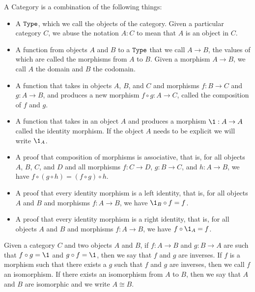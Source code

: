 \documentclass[../math.tex]{subfiles}
\begin{document}
\begin{definition}
    A Category is a combination of the following things:
    \begin{itemize}
        \item A $\Type$, which we call the objects of the category.  Given a
            particular category $C$, we abuse the notation $A : C$ to mean that
            $A$ is an object in $C$.
        \item A function from objects $A$ and $B$ to a $\Type$ that we call $A
            \to B$, the values of which are called the morphisms from $A$ to
            $B$.  Given a morphism $A \to B$, we call $A$ the domain and $B$ the
            codomain.
        \item A function that takes in objects $A$, $B$, and
            $C$ and morphisms $f : B \to C$ and $g : A \to B$, and produces a
            new morphism $f \circ g : A \to C$, called the composition of $f$
            and $g$.
        \item A function that takes in an object $A$ and produces a morphism
            $\1 : A \to A$ called the identity morphism.  If the object
            $A$ needs to be explicit we will write $\1_A$.
        \item A proof that composition of morphisms is associative, that is, for
            all objects $A$, $B$, $C$, and $D$ and all morphisms $f : C \to D$,
            $g : B \to C$, and $h : A \to B$, we have $f \circ (g \circ h) = (f
            \circ g) \circ h$.
        \item A proof that every identity morphism is a left identity, that is,
            for all objects $A$ and $B$ and morphisms $f : A \to B$, we have
            $\1_B \circ f = f$.
        \item A proof that every identity morphism is a right identity, that is,
            for all objects $A$ and $B$ and morphisms $f : A \to B$, we have
            $f \circ \1_A= f$.
    \end{itemize}
\end{definition}

\begin{definition}
    Given a category $C$ and two objects $A$ and $B$, if $f : A \to B$ and $g :
    B \to A$ are such that $f \circ g = \1$ and $g \circ f = \1$, then we
    say that $f$ and $g$ are inverses.  If $f$ is a morphism such that there
    exists a $g$ such that $f$ and $g$ are inverses, then we call $f$ an
    isomorphism.  If there exists an isomorphism from $A$ to $B$, then we say
    that $A$ and $B$ are isomorphic and we write $A \cong B$.
\end{definition}
\end{document}
